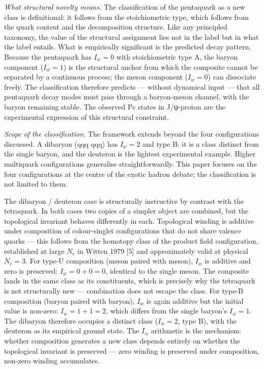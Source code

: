\emph{What structural novelty means.} The classification of the
pentaquark as a new class is definitional: it follows from
the stoichiometric type, which follows from the quark content and the
decomposition structure. Like any principled taxonomy, the value of the
structural assignment lies not in the label but in what the label
entails. What is empirically significant is the predicted decay pattern.
Because the pentaquark has \(I_w = 0\) with stoichiometric type A, the
baryon component (\(I_w = 1\)) is the structural anchor from which the
composite cannot be separated by a continuous process; the meson
component (\(I_w = 0\)) can dissociate freely. The classification
therefore predicts --- without dynamical input --- that all pentaquark
decay modes must pass through a baryon-meson channel, with the baryon
remaining stable. The observed Pc states in J/ψ-proton are the
experimental expression of this structural constraint.

\emph{Scope of the classification.} The framework extends beyond the
four configurations discussed. A dibaryon (qqq qqq) has \(I_w = 2\) and
type B; it is a class distinct from the single baryon, and
the deuteron is the lightest experimental example. Higher multiquark
configurations generalise straightforwardly. This paper focuses on the
four configurations at the centre of the exotic hadron debate; the
classification is not limited to them.

The dibaryon / deuteron case is structurally instructive by contrast
with the tetraquark. In both cases two copies of a simpler object are
combined, but the topological invariant behaves differently in each.
Topological winding is additive under composition of colour-singlet
configurations that do not share valence quarks --- this follows from
the homotopy class of the product field configuration, established at
large \(N_c\) in Witten 1979 {[}5{]} and approximately valid at physical
\(N_c = 3\). For type-U composition (meson paired with meson), \(I_w\)
is additive and zero is preserved: \(I_w = 0 + 0 = 0\), identical to the
single meson. The composite lands in the same class as its
constituents, which is precisely why the tetraquark is not structurally
new --- combination does not escape the class. For type-B
composition (baryon paired with baryon), \(I_w\) is again additive but
the initial value is non-zero: \(I_w = 1 + 1 = 2\), which differs from
the single baryon's \(I_w = 1\). The dibaryon therefore occupies a
distinct class (\(I_w = 2\), type B), with the deuteron as
its empirical ground state. The \(I_w\) arithmetic is the mechanism:
whether composition generates a new class depends entirely on
whether the topological invariant is preserved --- zero winding is
preserved under composition, non-zero winding accumulates.

